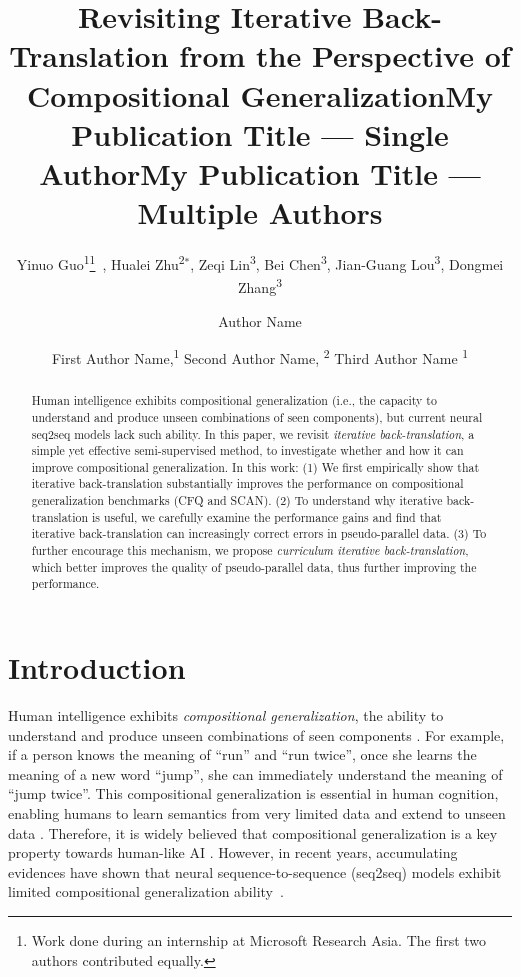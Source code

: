 \documentclass[letterpaper]{article} %
\title{Revisiting Iterative Back-Translation from the Perspective of Compositional Generalization}
\author{Yinuo Guo\textsuperscript{\rm 1}{\thanks{Work done during an internship at Microsoft Research Asia. The first two authors contributed equally.}}~, Hualei Zhu\textsuperscript{\rm 2}$^*$, Zeqi Lin\textsuperscript{\rm 3},  Bei Chen\textsuperscript{\rm 3}, Jian-Guang Lou\textsuperscript{\rm 3}, Dongmei Zhang\textsuperscript{\rm 3}\\}
\title{My Publication Title --- Single Author}
\author {
    Author Name \\
}
\title{My Publication Title --- Multiple Authors}
\author {
    First Author Name,\textsuperscript{\rm 1}
    Second Author Name, \textsuperscript{\rm 2}
    Third Author Name \textsuperscript{\rm 1} \\
}
\begin{document}
\maketitle

\begin{abstract}
Human intelligence exhibits compositional generalization (i.e., the capacity to
understand and produce unseen combinations of seen components), but current neural seq2seq models lack such ability.
In this paper, we revisit \emph{iterative back-translation}, a simple yet effective semi-supervised method, to investigate whether and how it can improve compositional generalization.
In this work:
(1) We first empirically show that iterative back-translation substantially improves the performance on compositional generalization benchmarks (CFQ and SCAN).
(2) To understand why iterative back-translation is useful, we carefully examine the performance gains and find that iterative back-translation can increasingly correct errors in pseudo-parallel data.
(3) To further encourage this mechanism, we propose \emph{curriculum iterative back-translation}, which better improves the quality of pseudo-parallel data, thus further improving the performance.
\end{abstract}

\section{Introduction}
Human intelligence exhibits \emph{compositional generalization}, the ability to understand and produce unseen combinations of seen components \cite{chomsky1965aspects,fodor1988connectionism}.
For example, if a person knows the meaning of ``run'' and ``run twice'', once she learns the meaning of a new word ``jump'', she can immediately understand the meaning of ``jump twice''.
This compositional generalization is essential in human cognition, enabling humans to learn semantics from very limited data and extend to unseen data \cite{montague1974formal,partee1984compositionality,lake2017building}.
Therefore, it is widely believed that compositional generalization is a key property towards human-like AI \cite{mikolov2016roadmap,bengio2019towards,mollica2020composition}.
However, in recent years, accumulating evidences have shown that neural sequence-to-sequence (seq2seq) models exhibit limited compositional generalization ability~\cite{lake2018generalization,hupkes2020compositionality,keysers2020measuring,furrer2020compositional}.
\end{document}
